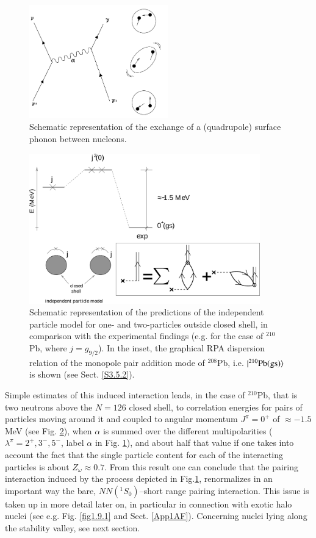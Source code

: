 \begin{figure}
\centerline {
\includegraphics*[width=6cm]{introduccion/figs/figintroD9}
}
\caption{Schematic representation of the exchange of a (quadrupole) surface phonon between nucleons.}
\label{fig:4.9}
\end{figure}
\begin{figure}
\centerline {
\includegraphics*[width=10cm]{introduccion/figs/figintroD10}
}
\caption{Schematic representation of the predictions of the independent particle model for one- and two-particles outside closed shell, in comparison with the experimental findings (e.g. for the case of $^{210}$Pb, where $j=g_{9/2}$). In the inset, the graphical RPA dispersion relation of the monopole pair addition mode of $^{208}$Pb, i.e. $|{^{210}\text{Pb(gs)}} \rangle$ is shown (see Sect. \ref{S3.5.2}).}
\label{fig:4.10}
\end{figure}
Simple estimates of this induced interaction leads, in the case of $^{210}$Pb, that is two neutrons above the $N=126$ closed shell, to correlation energies  for pairs of particles moving around it and coupled to angular momentum $J^{\pi} = 0^+$ of $\approx -1.5$ MeV (see Fig. \ref{fig:4.10}), when $\alpha$ is summed over  the different multipolarities  ($\lambda^{\pi}=2^+,3^-,5^-$, label $\alpha$ in Fig. \ref{fig:4.9}), and about half that value if one takes into account the fact that the single particle content  for each of the interacting particles is about $Z_\omega\approx0.7$. From this result one can conclude that the pairing interaction induced by the process depicted in Fig.\ref{fig:4.9}, renormalizes in an important way the bare, $NN(^1S_0)$--short range pairing interaction. This issue is taken up in more detail later on, in particular in connection with exotic halo nuclei (see e.g. Fig. \ref{fig1.9.1} and Sect. \ref{App1AF}). Concerning nuclei lying along the stability valley, see next section.

